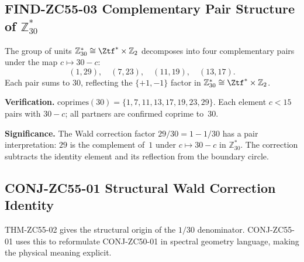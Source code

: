 \documentclass[12pt, a4paper]{article}
\begin{document}
\subsection{FIND-ZC55-03 \quad Complementary Pair Structure of
  $\mathbb{Z}_{30}^*$}
\label{sec:find03}


\begin{derivedbox}[title={FIND-ZC55-03:
  $\mathbb{Z}_{30}^*\cong\Ztf^*\times\mathbb{Z}_2$
  --- Four Complementary Pairs ($R_0$, Exact)}]
The group of units $\mathbb{Z}_{30}^*\cong\Ztf^*\times\mathbb{Z}_2$
decomposes into four complementary pairs under the map
$c\mapsto30-c$:
\[
  (1,29),\quad(7,23),\quad(11,19),\quad(13,17).
\]
Each pair sums to $30$, reflecting the $\{+1,-1\}$ factor in
$\mathbb{Z}_{30}^*\cong\Ztf^*\times\mathbb{Z}_2$.

\medskip
\textbf{Verification.}
$\mathrm{coprimes}(30)=\{1,7,11,13,17,19,23,29\}$.
Each element $c<15$ pairs with $30-c$; all partners are confirmed
coprime to~$30$.

\medskip
\textbf{Significance.}
The Wald correction factor $29/30=1-1/30$ has a pair interpretation:
$29$ is the complement of~$1$ under $c\mapsto30-c$ in
$\mathbb{Z}_{30}^*$.  The correction subtracts the identity
element and its reflection from the boundary circle.
\end{derivedbox}

\subsection{CONJ-ZC55-01 \quad Structural Wald Correction Identity}
\label{sec:conj01}

THM-ZC55-02 gives the structural origin of the $1/30$ denominator.
CONJ-ZC55-01 uses this to reformulate CONJ-ZC50-01 in spectral
geometry language, making the physical meaning explicit.

\end{document}
